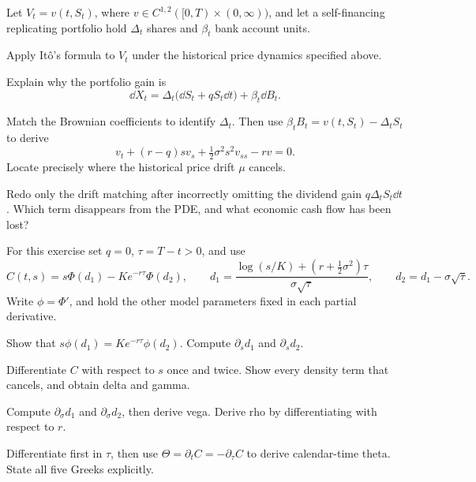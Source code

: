 \begin{exercise}
Let \(V_t=v(t,S_t)\), where
\(v\in C^{1,2}([0,T)\times(0,\infty))\), and let a self-financing
replicating portfolio hold \(\Delta_t\) shares and \(\beta_t\) bank
account units.
\begin{exparts}
  \item Apply It\^o's formula to \(V_t\) under the historical price dynamics
  specified above.
  \item Explain why the portfolio gain is
  \[
  \dd X_t
  =\Delta_t\bigl(\dd S_t+qS_t\dd t\bigr)+\beta_t\dd B_t.
  \]
  \item Match the Brownian coefficients to identify \(\Delta_t\). Then
  use \(\beta_tB_t=v(t,S_t)-\Delta_tS_t\) to derive
  \[
  \boxed{v_t+(r-q)s v_s+\tfrac12\sigma^2s^2v_{ss}-rv=0.}
  \]
  Locate precisely where the historical price drift \(\mu\)
  cancels.
  \item Redo only the drift matching after incorrectly omitting the dividend
  gain \(q\Delta_tS_t\dd t\). Which term disappears from the PDE, and
  what economic cash flow has been lost?
\end{exparts}
\end{exercise}

\begin{exercise}
For this exercise set \(q=0\), \(\tau=T-t>0\), and use
\[
C(t,s)=s\Phi(d_1)-Ke^{-r\tau}\Phi(d_2),\qquad
d_1=\frac{\log(s/K)+(r+\tfrac12\sigma^2)\tau}{\sigma\sqrt\tau},
\qquad d_2=d_1-\sigma\sqrt\tau.
\]
Write \(\phi=\Phi'\), and hold the other model parameters fixed in each
partial derivative.
\begin{exparts}
  \item Show that \(s\phi(d_1)=Ke^{-r\tau}\phi(d_2)\). Compute
  \(\partial_s d_1\) and \(\partial_s d_2\).
  \item Differentiate \(C\) with respect to \(s\) once and twice. Show
  every density term that cancels, and obtain delta and gamma.
  \item Compute \(\partial_\sigma d_1\) and \(\partial_\sigma d_2\),
  then derive vega. Derive rho by differentiating with respect to \(r\).
  \item Differentiate first in \(\tau\), then use
  \(\Theta=\partial_tC=-\partial_\tau C\) to derive calendar-time theta.
  State all five Greeks explicitly.
\end{exparts}
\end{exercise}

